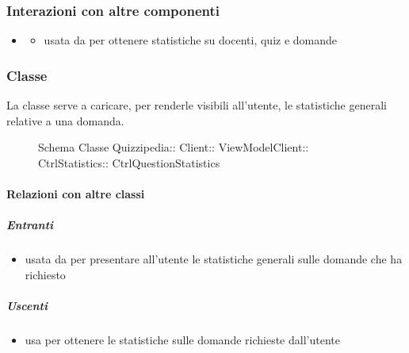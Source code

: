 \subsubsection{Interazioni con altre componenti}
\begin{itemize}
\item {}
\begin{itemize}
\item usata da  per ottenere statistiche su docenti, quiz e domande
\end{itemize}
\end{itemize}
\subsubsection{Classe }
La classe serve a caricare, per renderle visibili all'utente, le statistiche generali relative a una domanda.
\begin{figure}[H]
\centering
\noindent{}
\caption[Schema Classe CtrlQuestionStatistics]{Schema Classe Quizzipedia:: Client:: ViewModelClient:: CtrlStatistics:: CtrlQuestionStatistics}
\end{figure}
\paragraph{Relazioni con altre classi}
\subparagraph{Entranti}
\begin{itemize}
\item usata da  per presentare all'utente le statistiche generali sulle domande che ha richiesto
\end{itemize}
\subparagraph{Uscenti}
\begin{itemize}
\item usa  per ottenere le statistiche sulle domande richieste dall'utente
\end{itemize}
